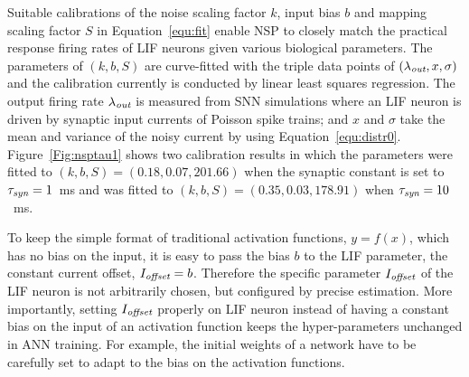 	Suitable calibrations of the noise scaling factor $k$, input bias $b$ and mapping scaling factor $S$ in Equation~\ref{equ:fit} enable NSP to closely match the practical response firing rates of LIF neurons given various biological parameters.
	The parameters of $(k, b, S)$ are curve-fitted with the triple data points of $(\lambda_{\textit{\textrm{out}}}, x, \sigma)$ and the calibration currently is conducted by linear least squares regression.
	The output firing rate $\lambda_{\textit{\textrm{out}}}$ is measured from SNN simulations where an LIF neuron is driven by synaptic input currents of Poisson spike trains;
	and $x$ and $\sigma$ take the mean and variance of the noisy current by using Equation~\ref{equ:distr0}. 
	Figure~\ref{Fig:nsptau1} shows two calibration results in which the parameters were fitted to $(k, b, S)=(0.18, 0.07, 201.66)$ when the synaptic constant is set to $\tau_{\textit{\textrm{syn}}}=1$~ms and was fitted to $(k, b, S)=(0.35, 0.03, 178.91)$ when $\tau_{\textit{\textrm{syn}}}=10$~ms.
	
	To keep the simple format of traditional activation functions, $y=f(x)$, which has no bias on the input, it is easy to pass the bias $b$ to the LIF parameter, the constant current offset, $I_{\textit{\textrm{offset}}}=b$.
	Therefore the specific parameter $I_{\textit{\textrm{offset}}}$ of the LIF neuron is not arbitrarily chosen, but configured by precise estimation.
	More importantly, setting $I_{\textit{\textrm{offset}}}$ properly on LIF neuron instead of having a constant bias on the input of an activation function keeps the hyper-parameters unchanged in ANN training.
	For example, the initial weights of a network have to be carefully set to adapt to the bias on the activation functions.
	
	
